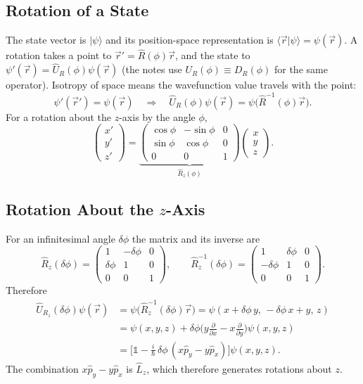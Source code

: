 \documentclass[11pt,a4paper]{article}
\begin{document}
\subsection{Rotation of a State}
The state vector is $|\psi\rangle$ and its position-space representation is $\langle\vec r|\psi\rangle=\psi(\vec r)$. A rotation takes a point to $\vec r'=\hat R(\phi)\vec r$, and the state to $\psi'(\vec r)=\hat U_R(\phi)\psi(\vec r)$ (the notes use $U_R(\phi)\equiv D_R(\phi)$ for the same operator). Isotropy of space means the wavefunction value travels with the point:
\[
\psi'(\vec r')=\psi(\vec r)\quad\Longrightarrow\quad \hat U_R(\phi)\psi(\vec r)=\psi\big(\hat R^{-1}(\phi)\vec r\big).
\]
For a rotation about the $z$-axis by the angle $\phi$,
\[
\begin{pmatrix}x'\\y'\\z'\end{pmatrix}=\underbrace{\begin{pmatrix}\cos\phi&-\sin\phi&0\\ \sin\phi&\cos\phi&0\\0&0&1\end{pmatrix}}_{\hat R_z(\phi)}\begin{pmatrix}x\\y\\z\end{pmatrix}.
\]

\subsection{Rotation About the \texorpdfstring{$z$}{z}-Axis}
For an infinitesimal angle $\delta\phi$ the matrix and its inverse are
\[
\hat R_z(\delta\phi)=\begin{pmatrix}1&-\delta\phi&0\\ \delta\phi&1&0\\0&0&1\end{pmatrix},\qquad
\hat R_z^{-1}(\delta\phi)=\begin{pmatrix}1&\delta\phi&0\\-\delta\phi&1&0\\0&0&1\end{pmatrix}.
\]
Therefore
\begin{align*}
\hat U_{R_z}(\delta\phi)\psi(\vec r)&=\psi\big(\hat R_z^{-1}(\delta\phi)\vec r\big)=\psi(x+\delta\phi\,y,\,-\delta\phi\,x+y,\,z)\\
&=\psi(x,y,z)+\delta\phi\Big(y\frac{\partial}{\partial x}-x\frac{\partial}{\partial y}\Big)\psi(x,y,z)\\
&=\Big[\mathbb 1-\frac i\hbar\,\delta\phi\,(x\hat p_y-y\hat p_x)\Big]\psi(x,y,z).
\end{align*}
The combination $x\hat p_y-y\hat p_x$ is $\hat L_z$, which therefore generates rotations about $z$.
\end{document}
